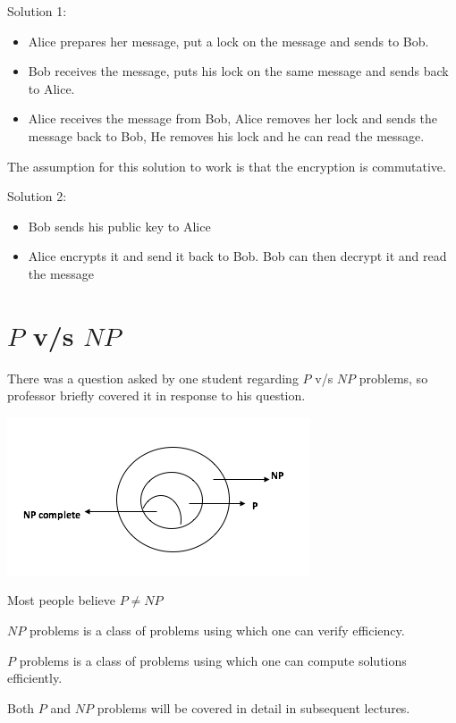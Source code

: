 \documentclass[twoside]{article}
\begin{document}
Solution 1:
\begin{itemize}
   
\item
Alice prepares her message, put a lock on the message and sends to Bob.
\item
Bob receives the message, puts his lock on the same message and sends back to Alice.
\item
Alice receives the message from Bob, Alice removes her lock and sends the message back to Bob, He removes his lock and he can read the message.
\end{itemize}

The assumption for this solution to work is that the encryption is commutative.


Solution 2:

\begin{itemize}
\item
Bob sends his public key to Alice
\item
Alice encrypts it and send it back to Bob. Bob can then decrypt it and read the message
\end{itemize}

\section{$P$ v/s $NP$}

There was a question asked by one student regarding $P$ v/s $NP$ problems, so professor briefly covered it in response to his question.

\includegraphics[scale=0.7]{images/NP.png}

Most people believe $P$$\neq$$NP$

$NP$ problems is a class of problems using which one can verify efficiency.

$P$ problems is a class of problems using which one can compute solutions efficiently.


Both $P$ and $NP$ problems will be covered in detail in subsequent lectures.
\end{document}
